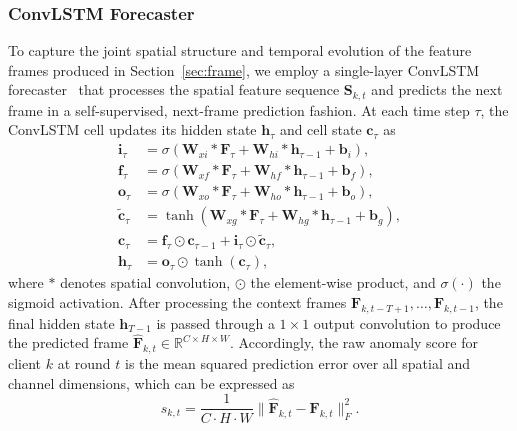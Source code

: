 \documentclass[journal]{IEEEtran}
\begin{document}
\subsubsection{ConvLSTM Forecaster}
To capture the joint spatial structure and temporal evolution of the feature frames produced in Section~\ref{sec:frame}, we employ a single-layer ConvLSTM forecaster~\cite{shi2015convolutional} that processes the spatial feature sequence $\mathbf{S}_{k,t}$ and predicts the next frame in a self-supervised, next-frame prediction fashion. At each time step $\tau$, the ConvLSTM cell updates its hidden state $\mathbf{h}_\tau$ and cell state $\mathbf{c}_\tau$ as
\begin{align}
\mathbf{i}_\tau &= \sigma(\mathbf{W}_{xi} * \mathbf{F}_\tau + \mathbf{W}_{hi} * \mathbf{h}_{\tau-1} + \mathbf{b}_i), \label{eq:lstm_i}\\
\mathbf{f}_\tau &= \sigma(\mathbf{W}_{xf} * \mathbf{F}_\tau + \mathbf{W}_{hf} * \mathbf{h}_{\tau-1} + \mathbf{b}_f), \label{eq:lstm_f}\\
\mathbf{o}_\tau &= \sigma(\mathbf{W}_{xo} * \mathbf{F}_\tau + \mathbf{W}_{ho} * \mathbf{h}_{\tau-1} + \mathbf{b}_o), \label{eq:lstm_o}\\
\tilde{\mathbf{c}}_\tau &= \tanh(\mathbf{W}_{xg} * \mathbf{F}_\tau + \mathbf{W}_{hg} * \mathbf{h}_{\tau-1} + \mathbf{b}_g), \label{eq:lstm_g}\\
\mathbf{c}_\tau &= \mathbf{f}_\tau \odot \mathbf{c}_{\tau-1} + \mathbf{i}_\tau \odot \tilde{\mathbf{c}}_\tau, \label{eq:lstm_c}\\
\mathbf{h}_\tau &= \mathbf{o}_\tau \odot \tanh(\mathbf{c}_\tau), \label{eq:lstm_h}
\end{align}
where $*$ denotes spatial convolution, $\odot$ the element-wise product, and $\sigma(\cdot)$ the sigmoid activation. After processing the context frames $\mathbf{F}_{k,t-T+1}, \ldots, \mathbf{F}_{k,t-1}$, the final hidden state $\mathbf{h}_{T-1}$ is passed through a $1 \times 1$ output convolution to produce the predicted frame $\hat{\mathbf{F}}_{k,t} \in \mathbb{R}^{C \times H \times W}$. Accordingly, the raw anomaly score for client $k$ at round $t$ is the mean squared prediction error over all spatial and channel dimensions, which can be expressed as
\begin{equation}
s_{k,t} = \frac{1}{C \cdot H \cdot W} \|\hat{\mathbf{F}}_{k,t} - \mathbf{F}_{k,t}\|_F^2.
\label{eq:anomaly_score}
\end{equation}
\end{document}
